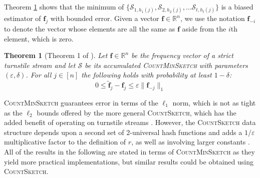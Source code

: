 \documentclass{report}
\newtheorem{theorem}{Theorem}[section]
\newcommand{\algoname}[1]{\textnormal{\textsc{#1}}}
\begin{document}
Theorem \ref{thm:cms:err} shows that the minimum of $\{\mathcal{S}_{1,h_1(j)}, \mathcal{S}_{2,h_2(j)}, \dots \mathcal{S}_{t,h_t(j)}\}$ is a biased estimator of $\mathbf{f}_j$ with bounded error.
Given a vector $\mathbf{f} \in \mathbb{R}^n$, we use the notation $\mathbf{f}_{-i}$ to denote the vector whose elements are all the same as $\mathbf{f}$ aside from the $i$th element, which is zero.
%
\begin{theorem}[Theorem 1 of \cite{cormode2005improved}] \label{thm:cms:err}
Let $\mathbf{f} \in \mathbb{R}^n$ be the frequency vector of a strict turnstile stream and let $\mathcal{S}$ be its accumulated \algoname{CountMinSketch} with parameters $(\varepsilon, \delta)$.
For all $j \in [n]$ the following holds with probability at least $1-\delta$:
%
\begin{equation*}
0 \leq \widetilde{\mathbf{f}}_j - \mathbf{f}_j \leq \varepsilon \|\mathbf{f}_{-j}\|_1
\end{equation*}
%
\end{theorem}
%

\algoname{CountMinSketch} guarantees error in terms of the $\ell_1$ norm, which is not as tight as the $\ell_2$ bounds offered by the more general \algoname{CountSketch}, which has the added benefit of operating on turnstile streams \cite{charikar2002finding}. 
However, the \algoname{CountSketch} data structure depends upon a second set of 2-universal hash functions and adds a $1/\varepsilon$ multiplicative factor to the definition of $r$, as well as involving larger constants \cite{cormode2005improved}.
All of the results in the following are stated in terms of \algoname{CountMinSketch} as they yield more practical implementations, but similar results could be obtained using \algoname{CountSketch}.
\end{document}
